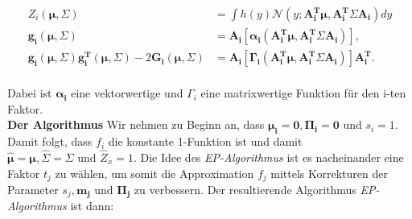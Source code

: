 \documentclass[12pt,a4paper]{scrartcl}
\numberwithin{equation}{section}
\begin{document}
\begin{equation}
 \begin{split}
 Z_i(\mathbf{\mu, \varSigma}) &= \int h(y) \mathcal{N}(y;\mathbf{A_i^T \mu, A_i^T \varSigma A_i})dy \\
 \mathbf{g_i(\mu, \varSigma)} &= \mathbf{A_i[\alpha_i(A_i^T \mu, A_i^T \varSigma A_i)]}, \\
 \mathbf{g_i(\mu, \varSigma) g_i^T(\mu, \varSigma)} - 2 \mathbf{G_i(\mu,\varSigma)} &= \mathbf{A_i[\Gamma_i(A_i^T \mu, A_i^T \varSigma A_i)] A_i^T}.\\
 \end{split}
 \end{equation}

Dabei ist $\mathbf{\alpha_i}$ eine vektorwertige und $\Gamma_i$ eine matrixwertige Funktion für den i-ten Faktor.\\

\textbf{Der Algorithmus} Wir nehmen zu Beginn an, dass $\mathbf{\mu_i = 0, \Pi_i = 0} $ und $s_i = 1$. 
Damit folgt, dass $f_i$ die konstante 1-Funktion ist und damit $\mathbf{\hat \mu = \mu , \hat \varSigma = \varSigma} \text{ und } \hat Z_x = 1 $.
Die Idee des \textit{EP-Algorithmus} ist es nacheinander eine Faktor $t_j$ zu wählen, um somit die Approximation
$f_j$ mittels Korrekturen der Parameter $s_j, \mathbf{m_j} \text{ und } \mathbf{\Pi_j}$ zu verbessern. 
Der resultierende Algorithmus \textit{EP-Algorithmus} ist dann: 
\end{document}
